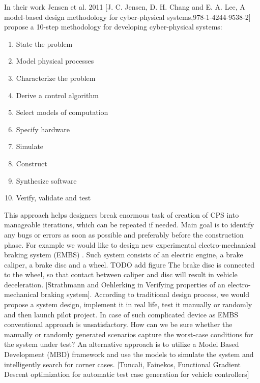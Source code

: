 In their work Jensen et al. 2011  [J. C. Jensen, D. H. Chang and E. A. Lee, A model-based design methodology for cyber-physical systems,978-1-4244-9538-2] propose a 10-step methodology for developing cyber-physical systems:

\begin{enumerate}
	\item State the problem
	\item Model physical processes
	\item Characterize the problem
	\item Derive a control algorithm
	\item Select models of computation
	\item Specify hardware
	\item Simulate
	\item Construct
	\item Synthesize software
	\item Verify, validate and test
\end{enumerate}

This approach helps designers break enormous task of creation of CPS into manageable iterations, which can be repeated if needed. Main goal is to identify any bugs or errors as soon as possible and preferably before the construction phase. For example we would like to design new experimental electro-mechanical braking system (EMBS) . Such system consists of an electric engine, a brake caliper, a brake disc and a wheel. TODO add figure The brake disc is connected to the wheel, so that contact between caliper and disc will result in vehicle deceleration. [Strathmann and Oehlerking in Verifying properties of an electro-mechanical braking system]. According to traditional design process, we would propose a system design, implement it in real life, test it manually or randomly and then launch pilot project. In case of such complicated device as EMBS conventional approach is unsatisfactory. How can we be sure whether the manually or randomly generated scenarios capture the worst-case conditions for the system under test? An alternative approach is to utilize a Model Based Development (MBD) framework and use the models to simulate the system and intelligently search for corner cases. [Tuncali, Fainekos, Functional Gradient Descent optimization for automatic test case generation for vehicle controllers]

